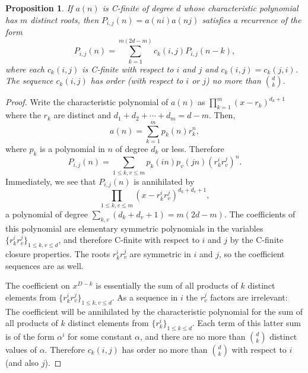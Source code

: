 \documentclass[12pt]{article}
\newtheorem{proposition}{Proposition}
\begin{document}
\begin{proposition}
    \label{product-rec}
    If $a(n)$ is C-finite of degree $d$ whose characteristic polynomial has $m$
    distinct roots, then $P_{i, j}(n) = a(ni) a(nj)$ satisfies a recurrence of
    the form
    \begin{equation*}
        P_{i, j}(n) = \sum_{k = 1}^{m(2d - m)} c_k(i, j) P_{i, j}(n - k),
    \end{equation*}
    where each $c_k(i, j)$ is C-finite with respect to $i$ and $j$ and $c_k(i,
    j) = c_k(j, i)$. The sequence $c_k(i, j)$ has order (with respect to $i$ or
    $j$) no more than ${d \choose k}$.
\end{proposition}

\begin{proof}
    Write the characteristic polynomial of $a(n)$ as $\prod_{k = 1}^m (x -
    r_k)^{d_k + 1}$ where the $r_k$ are distinct and $d_1 + d_2 + \cdots + d_m =
    d - m$. Then,
    \begin{equation*}
        a(n) = \sum_{k = 1}^m p_k(n) r_k^n,
    \end{equation*}
    where $p_k$ is a polynomial in $n$ of degree $d_k$ or less. Therefore
    \begin{equation*}
        P_{i, j}(n) = \sum_{1 \leq k, v \leq m} p_k(in) p_v(jn) (r_k^i r_v^j)^n.
    \end{equation*}
    Immediately, we see that $P_{i, j}(n)$ is annihilated by
    \begin{equation}
        \label{product-killer}
        \prod_{1 \leq k, v \leq m} (x - r_k^i r_v^j)^{d_k + d_v + 1},
    \end{equation}
    a polynomial of degree $\sum_{k, v} (d_k + d_v + 1) = m(2d - m)$. The
    coefficients of this polynomial are elementary symmetric polynomials in the
    variables $\{r_k^i r_v^j\}_{1 \leq k, v \leq d}$, and therefore C-finite
    with respect to $i$ and $j$ by the C-finite closure properties. The roots
    $r_k^i r_v^j$ are symmetric in $i$ and $j$, so the coefficient sequences
    are as well.

    The coefficient on $x^{D - k}$ is essentially the sum of all products of
    $k$ distinct elements from $\{r_k^i r_v^j\}_{1 \leq k, v \leq d}$. As a
    sequence in $i$ the $r_v^j$ factors are irrelevant: The coefficient will be
    annihilated by the characteristic polynomial for the sum of all products of
    $k$ distinct elements from $\{r_k^i\}_{1 \leq k \leq d}$. Each term of this
    latter sum is of the form $\alpha^i$ for some constant $\alpha$, and there
    are no more than ${d \choose k}$ distinct values of $\alpha$. Therefore
    $c_k(i, j)$ has order no more than ${d \choose k}$ with respect to $i$ (and
    also $j$).
\end{proof}
\end{document}
